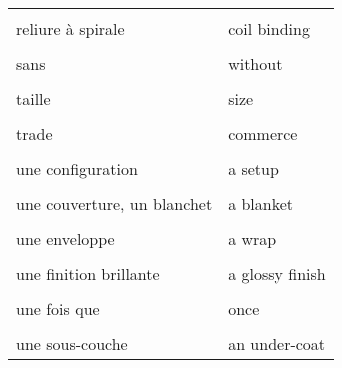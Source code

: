 \documentclass[
  10pt,
]{article}
\begin{document}
\begin{longtable}{ll}
\cellcolor{gray!6}{relier (un livre)} & \cellcolor{gray!6}{to bind (bound, bound)}\\

reliure à spirale & coil binding\\

\cellcolor{gray!6}{résulter dans, aboutir à} & \cellcolor{gray!6}{to result in}\\

sans & without\\

\cellcolor{gray!6}{stokage} & \cellcolor{gray!6}{storage}\\

taille & size\\

\cellcolor{gray!6}{tomber, chuter} & \cellcolor{gray!6}{to fall (fell, fallen)}\\

trade & commerce\\

\cellcolor{gray!6}{une agence de communication} & \cellcolor{gray!6}{an ad(vertising) agency}\\

une configuration & a setup\\

\cellcolor{gray!6}{une couche} & \cellcolor{gray!6}{a layer}\\

une couverture, un blanchet & a blanket\\

\cellcolor{gray!6}{une encoche} & \cellcolor{gray!6}{a notch}\\

une enveloppe & a wrap\\

\cellcolor{gray!6}{une fente} & \cellcolor{gray!6}{a slit}\\

une finition brillante & a glossy finish\\

\cellcolor{gray!6}{une finition mate} & \cellcolor{gray!6}{a matte finish}\\

une fois que & once\\

\cellcolor{gray!6}{une plaque} & \cellcolor{gray!6}{a plate}\\

une sous-couche & an under-coat\\


\end{longtable}
\end{document}
